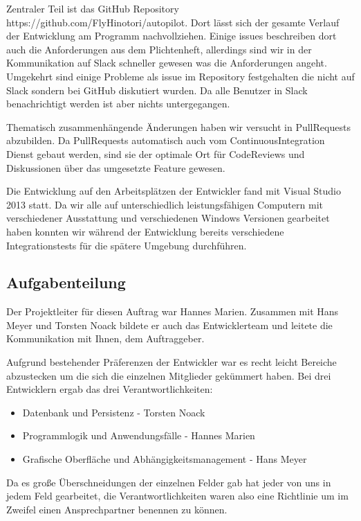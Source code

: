 \documentclass[12pt]{article}
\begin{document}
Zentraler Teil ist das GitHub Repository https://github.com/FlyHinotori/autopilot. Dort lässt sich der gesamte Verlauf der Entwicklung am Programm nachvollziehen. Einige issues beschreiben dort auch die Anforderungen aus dem Plichtenheft, allerdings sind wir in der Kommunikation auf Slack schneller gewesen was die Anforderungen angeht. Umgekehrt sind einige Probleme als issue im Repository festgehalten die nicht auf Slack sondern bei GitHub diskutiert wurden. Da alle Benutzer in Slack benachrichtigt werden ist aber nichts untergegangen.

Thematisch zusammenhängende Änderungen haben wir versucht in PullRequests abzubilden. Da PullRequests automatisch auch vom ContinuousIntegration Dienst gebaut werden, sind sie der optimale Ort für CodeReviews und Diskussionen über das umgesetzte Feature gewesen.

Die Entwicklung auf den Arbeitsplätzen der Entwickler fand mit Visual Studio 2013 statt. Da wir alle auf unterschiedlich leistungsfähigen Computern mit verschiedener Ausstattung und verschiedenen Windows Versionen gearbeitet haben konnten wir während der Entwicklung bereits verschiedene Integrationstests für die spätere Umgebung durchführen.

\subsection{Aufgabenteilung}

Der Projektleiter für diesen Auftrag war Hannes Marien. Zusammen mit Hans Meyer und Torsten Noack bildete er auch das Entwicklerteam und leitete die Kommunikation mit Ihnen, dem Auftraggeber.

Aufgrund bestehender Präferenzen der Entwickler war es recht leicht Bereiche abzustecken um die sich die einzelnen Mitglieder gekümmert haben. Bei drei Entwicklern ergab das drei Verantwortlichkeiten: 

\begin{itemize}
  \item Datenbank und Persistenz - Torsten Noack
  \item Programmlogik und Anwendungsfälle - Hannes Marien
  \item Grafische Oberfläche und Abhängigkeitsmanagement - Hans Meyer
\end{itemize}

Da es große Überschneidungen der einzelnen Felder gab hat jeder von uns in jedem Feld gearbeitet, die Verantwortlichkeiten waren also eine Richtlinie um im Zweifel einen Ansprechpartner benennen zu können.
\end{document}
